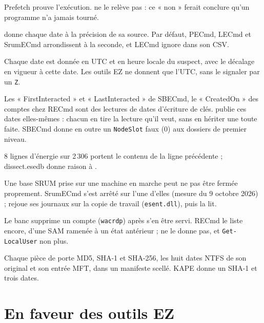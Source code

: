 \documentclass[11pt,a4paper,oneside]{report}
\begin{document}
\begin{description}[style=nextline,leftmargin=1em]
        Prefetch prouve l'exécution. \wac{} ne le relève pas : ce « non » ferait
        conclure qu'un programme n'a jamais tourné.
  \item[Précision au 100\,ns] \wac{} donne chaque date à la précision de sa
        source. Par défaut, PECmd, LECmd et SrumECmd arrondissent à la seconde, et
        LECmd ignore  dans son CSV.
  \item[Heure locale datée] Chaque date est donnée en UTC et en heure locale du
        suspect, avec le décalage en vigueur à cette date. Les outils EZ ne
        donnent que l'UTC, sans le signaler par un \texttt{Z}.
  \item[Lectures d'autrui vérifiées] Les « FirstInteracted » et
        « LastInteracted » de SBECmd, le « CreatedOn » des comptes chez RECmd sont
        des lectures de dates d'écriture de clés. \wac{} publie ces dates
        elles-mêmes : chacun en tire la lecture qu'il veut, sans en hériter une
        toute faite. SBECmd donne en outre un \texttt{NodeSlot} faux (0) aux
        dossiers de premier niveau.
  \item[Erreurs de lecture ESE de SrumECmd] 8 lignes d'énergie sur 2\,306 portent
        le contenu de la ligne précédente ; dissect.esedb donne raison à \wac{}.
  \item[Base ESE non fermée proprement] Une base SRUM prise sur une machine en
        marche peut ne pas être fermée proprement. SrumECmd s'est arrêté sur
        l'une d'elles (mesure du 9 octobre 2026) ; \wac{}
        rejoue ses journaux sur la copie de travail (\texttt{esent.dll}), puis la
        lit.
  \item[Comptes supprimés] Le banc supprime un compte (\texttt{wacrdp}) après
        s'en être servi. RECmd le liste encore, d'une SAM ramenée à un état
        antérieur ; \wac{} ne le donne pas, et \texttt{Get-LocalUser} non plus.
  \item[Collecte] Chaque pièce de \wac{} porte MD5, SHA-1 et SHA-256, les huit
        dates NTFS de son original et son entrée MFT, dans un manifeste scellé.
        KAPE donne un SHA-1 et trois dates.
\end{description}

\section{En faveur des outils EZ}\label{sec:couverture}
\end{document}
